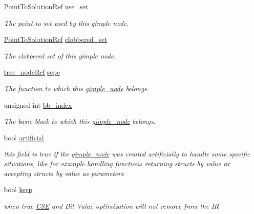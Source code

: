 \begin{DoxyCompactItemize}
\hyperlink{tree__node_8hpp_a4b5be0c528f25b8cb0b0fbc3b957d725}{Point\+To\+Solution\+Ref} \hyperlink{structgimple__node_a0688350276799812ef62e5cbea4cfa1a}{use\+\_\+set}
\begin{DoxyCompactList}\small\item\em The point-\/to set used by this gimple node. \end{DoxyCompactList}\item 
\hyperlink{tree__node_8hpp_a4b5be0c528f25b8cb0b0fbc3b957d725}{Point\+To\+Solution\+Ref} \hyperlink{structgimple__node_aea4174753eb2c9916562456f947a78b0}{clobbered\+\_\+set}
\begin{DoxyCompactList}\small\item\em The clobbered set of this gimple node. \end{DoxyCompactList}\item 
\hyperlink{tree__node_8hpp_a6ee377554d1c4871ad66a337eaa67fd5}{tree\+\_\+node\+Ref} \hyperlink{structgimple__node_aa58e5fa606b99e64861662ba81f0949c}{scpe}
\begin{DoxyCompactList}\small\item\em The function to which this \hyperlink{structgimple__node}{gimple\+\_\+node} belongs. \end{DoxyCompactList}\item 
unsigned int \hyperlink{structgimple__node_a1e7e788aa8bc698b56e81bb33180648c}{bb\+\_\+index}
\begin{DoxyCompactList}\small\item\em The basic block to which this \hyperlink{structgimple__node}{gimple\+\_\+node} belongs. \end{DoxyCompactList}\item 
bool \hyperlink{structgimple__node_a95522a48a8ea04d54c39933f975a0f54}{artificial}
\begin{DoxyCompactList}\small\item\em this field is true if the \hyperlink{structgimple__node}{gimple\+\_\+node} was created artificially to handle some specific situations, like for example handling functions returning structs by value or accepting structs by value as parameters \end{DoxyCompactList}\item 
bool \hyperlink{structgimple__node_a48e4239379d64efd883b9ba8aeb0c904}{keep}
\begin{DoxyCompactList}\small\item\em when true \hyperlink{classCSE}{C\+SE} and Bit Value optimization will not remove from the IR \end{DoxyCompactList}\end{DoxyCompactItemize}

